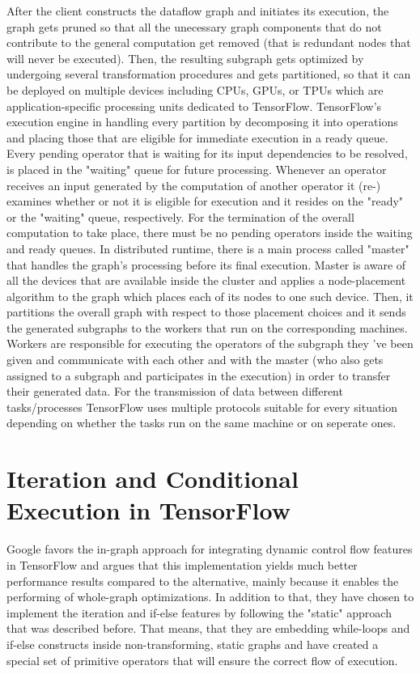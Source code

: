 \documentclass[ack,preface]{dithesis}
\begin{document}
After the client constructs the dataflow graph and initiates its execution, the graph gets pruned so that all the unecessary graph components that do not contribute to the general computation get removed (that is redundant nodes that will never be executed). Then, the resulting subgraph gets optimized by undergoing several transformation procedures and gets partitioned, so that it can be deployed on multiple devices including CPUs, GPUs, or TPUs which are application-specific processing units dedicated to TensorFlow. TensorFlow's execution engine in handling every partition by decomposing it into operations and placing those that are eligible for immediate execution in a ready queue. Every pending operator that is waiting for its input dependencies to be resolved, is placed in the "waiting" queue for future processing. Whenever an operator receives an input generated by the computation of another operator it (re-) examines whether or not it is eligible for execution and it resides on the "ready" or the "waiting" queue, respectively. For the termination of the overall computation to take place, there must be no pending operators inside the waiting and ready queues.
In distributed runtime, there is a main process called "master" that handles the graph's processing before its final execution. Master is aware of all the devices that are available inside the cluster 
and  applies a node-placement algorithm to the graph which places each of its nodes to one such device. Then, it partitions the overall graph with respect to those placement choices and it sends the generated subgraphs to the workers that run on the corresponding machines. Workers are responsible for executing the operators of the subgraph they 've been given and communicate with each other and with the master (who also gets assigned to a subgraph and participates in the execution) in order to transfer their generated data. For the transmission of data  between different tasks/processes TensorFlow uses multiple protocols suitable for every situation depending on whether the tasks run on the same machine or on seperate ones.

    \section{Iteration and Conditional Execution in TensorFlow}
Google favors the in-graph approach for integrating dynamic control flow features in TensorFlow and argues that this implementation yields much better performance results compared to the alternative, mainly because it enables the performing of whole-graph optimizations. \cite{Yu:2018} In addition to that, they have chosen to implement the iteration and if-else features by following the "static" approach that was described before. That means, that they are embedding while-loops and if-else constructs inside non-transforming, static graphs and have created a special set of primitive operators that will ensure the correct flow of execution.
\end{document}
